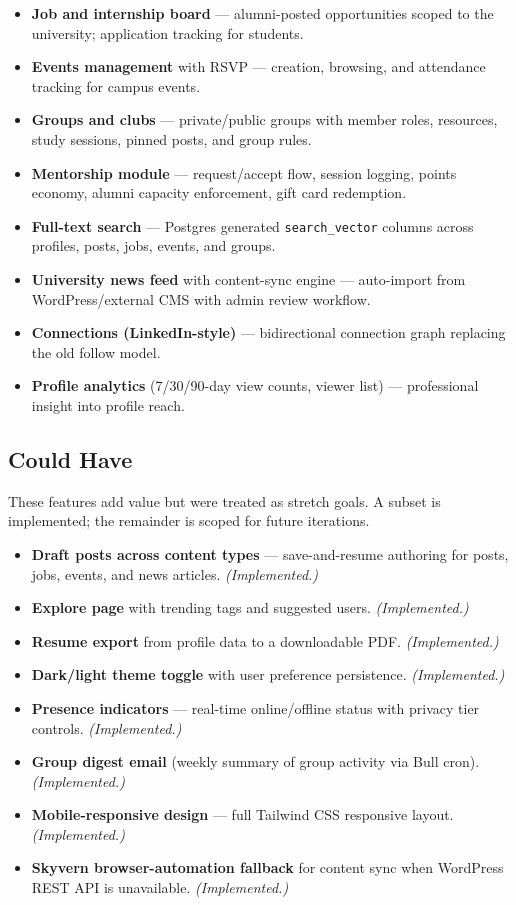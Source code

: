 \documentclass[12pt, a4paper]{article}
\begin{document}
\begin{itemize}
    \item \textbf{Job and internship board} --- alumni-posted opportunities scoped to
    the university; application tracking for students.
    \item \textbf{Events management} with RSVP --- creation, browsing, and attendance
    tracking for campus events.
    \item \textbf{Groups and clubs} --- private/public groups with member roles,
    resources, study sessions, pinned posts, and group rules.
    \item \textbf{Mentorship module} --- request/accept flow, session logging, points
    economy, alumni capacity enforcement, gift card redemption.
    \item \textbf{Full-text search} --- Postgres generated \texttt{search\_vector}
    columns across profiles, posts, jobs, events, and groups.
    \item \textbf{University news feed} with content-sync engine --- auto-import
    from WordPress/external CMS with admin review workflow.
    \item \textbf{Connections (LinkedIn-style)} --- bidirectional connection graph
    replacing the old follow model.
    \item \textbf{Profile analytics} (7/30/90-day view counts, viewer list) ---
    professional insight into profile reach.
\end{itemize}

\subsection{Could Have}

These features add value but were treated as stretch goals. A subset is implemented;
the remainder is scoped for future iterations.

\begin{itemize}
    \item \textbf{Draft posts across content types} --- save-and-resume authoring
    for posts, jobs, events, and news articles. \textit{(Implemented.)}
    \item \textbf{Explore page} with trending tags and suggested users.
    \textit{(Implemented.)}
    \item \textbf{Resume export} from profile data to a downloadable PDF.
    \textit{(Implemented.)}
    \item \textbf{Dark/light theme toggle} with user preference persistence.
    \textit{(Implemented.)}
    \item \textbf{Presence indicators} --- real-time online/offline status with
    privacy tier controls. \textit{(Implemented.)}
    \item \textbf{Group digest email} (weekly summary of group activity via Bull cron).
    \textit{(Implemented.)}
    \item \textbf{Mobile-responsive design} --- full Tailwind CSS responsive layout.
    \textit{(Implemented.)}
    \item \textbf{Skyvern browser-automation fallback} for content sync when WordPress
    REST API is unavailable. \textit{(Implemented.)}
\end{itemize}
\end{document}
